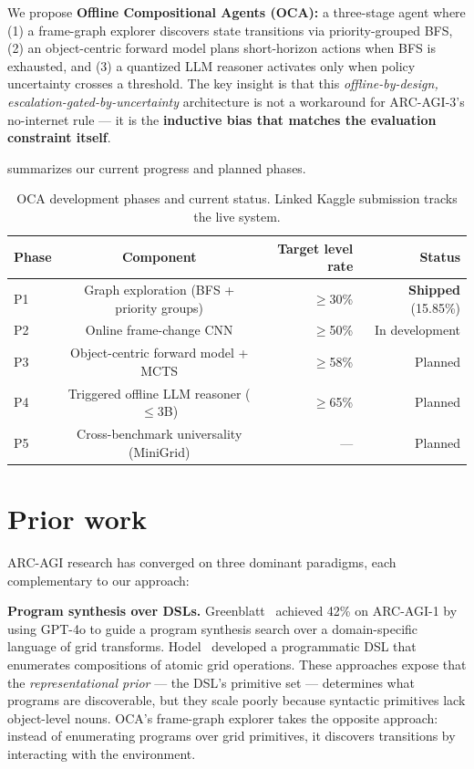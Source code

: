 \documentclass[10pt,letterpaper]{article}
\begin{document}
We propose \textbf{Offline Compositional Agents (OCA):} a three-stage agent where (1) a frame-graph explorer discovers state transitions via priority-grouped BFS, (2) an object-centric forward model plans short-horizon actions when BFS is exhausted, and (3) a quantized LLM reasoner activates only when policy uncertainty crosses a threshold.
The key insight is that this \textit{offline-by-design, escalation-gated-by-uncertainty} architecture is not a workaround for ARC-AGI-3's no-internet rule --- it is the \textbf{inductive bias that matches the evaluation constraint itself}.

 summarizes our current progress and planned phases.

\begin{table}[h]
\centering
\small
\begin{tabular}{lcrr}
\toprule
Phase & Component & Target level rate & Status \\
\midrule
P1 & Graph exploration (BFS + priority groups) & $\geq$30\% & \textbf{Shipped} (15.85\%) \\
P2 & Online frame-change CNN & $\geq$50\% & In development \\
P3 & Object-centric forward model + MCTS & $\geq$58\% & Planned \\
P4 & Triggered offline LLM reasoner ($\leq$3B) & $\geq$65\% & Planned \\
P5 & Cross-benchmark universality (MiniGrid) & --- & Planned \\
\bottomrule
\end{tabular}
\caption{OCA development phases and current status. Linked Kaggle submission tracks the live system.}
\label{tab:phase-summary}
\end{table}

\section{Prior work}\label{sec:prior}

ARC-AGI research has converged on three dominant paradigms, each complementary to our approach:

\textbf{Program synthesis over DSLs.}
Greenblatt~\cite{greenblatt2024arcgpt4o} achieved 42\% on ARC-AGI-1 by using GPT-4o to guide a program synthesis search over a domain-specific language of grid transforms.
Hodel~\cite{hodel2024dsl} developed a programmatic DSL that enumerates compositions of atomic grid operations.
These approaches expose that the \textit{representational prior} --- the DSL's primitive set --- determines what programs are discoverable, but they scale poorly because syntactic primitives lack object-level nouns.
OCA's frame-graph explorer takes the opposite approach: instead of enumerating programs over grid primitives, it discovers transitions by interacting with the environment.
\end{document}
